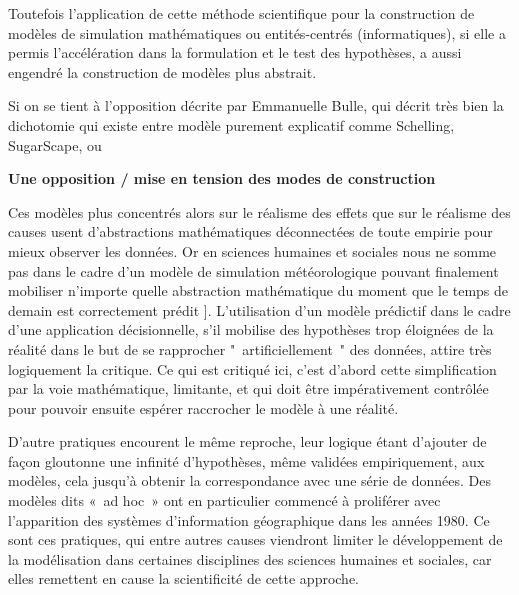 
Toutefois l'application de cette méthode scientifique pour la construction de modèles de simulation mathématiques ou entités-centrés (informatiques), si elle a permis l'accélération dans la formulation et le test des hypothèses, a aussi engendré la construction de modèles plus abstrait. 

Si on se tient à l'opposition décrite par Emmanuelle Bulle, qui décrit très bien la dichotomie qui existe entre modèle purement explicatif comme Schelling, SugarScape, ou 
 
 \textbf{Une opposition / mise en tension des modes de construction }

 Ces modèles plus concentrés alors sur le réalisme des effets que sur le réalisme des causes usent d'abstractions mathématiques déconnectées de toute empirie pour mieux observer les données. Or en sciences humaines et sociales nous ne somme pas dans le cadre d'un modèle de simulation météorologique pouvant finalement mobiliser n'importe quelle abstraction mathématique du moment que le temps de demain est correctement prédit \autocite[]{Elsenbroich2012} \autocite{Kuppers2005}]. L'utilisation d’un modèle prédictif dans le cadre d'une application décisionnelle, s’il mobilise des hypothèses trop éloignées de la réalité dans le but de se rapprocher " artificiellement " des données, attire très logiquement la critique. Ce qui est critiqué ici, c'est d'abord cette simplification par la voie mathématique, limitante, et qui doit être impérativement contrôlée pour pouvoir ensuite espérer raccrocher le modèle à une réalité.

D’autre pratiques encourent le même reproche, leur logique étant d’ajouter de façon gloutonne une infinité  d'hypothèses, même validées empiriquement, aux modèles,  cela jusqu'à obtenir la correspondance avec une série de données. Des modèles dits « ad hoc » ont en particulier commencé à proliférer avec l’apparition des systèmes d’information géographique dans les années 1980. Ce sont ces pratiques, qui entre autres causes viendront limiter le développement de la modélisation dans certaines disciplines des sciences humaines et sociales, car elles remettent en cause la scientificité de cette approche. 

